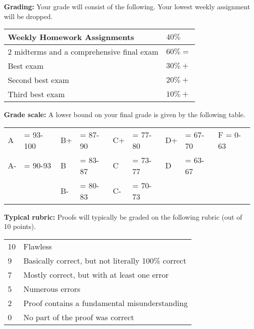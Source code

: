 \documentclass[12pt]{article}
\begin{document}
\noindent\textbf{Grading:}
Your grade will consist of the following. Your lowest weekly assignment will be dropped.

\begin{center}
 \begin{tabular}{|l|l|}
 \hline
 Weekly Homework Assignments & $40\%$ \\
 \hline
 2 midterms and a comprehensive final exam & $60\% = $ 	 \\
 Best exam & $30\% + $ 	 \\
 Second best exam& $20\% + $ 	 \\
 Third best exam & $10\% + $ 	 \\
 \hline
 \end{tabular}
\end{center}

\vspace*{.15in}
\noindent\textbf{Grade scale:}
A lower bound on your final grade is given by the following table.

\begin{center}
 \begin{tabular}{|ll|ll|ll|ll|l|}
\hline
A &\hspace{-3 pt}\hspace{-7 pt}= 93-100 &B+ &\hspace{-7 pt}= 87-90 &C+ &\hspace{-7 pt}= 77-80 & D+ &\hspace{-7 pt}= 67-70 & F = 0-63\\
A- &\hspace{-3 pt}\hspace{-7 pt}= 90-93 &B &\hspace{-7 pt}= 83-87 & C &\hspace{-7 pt}= 73-77 & D &\hspace{-7 pt}= 63-67 &\\
 & &B- &\hspace{-7 pt}= 80-83 &C- &\hspace{-7 pt}= 70-73 & & &\\
 \hline
 \end{tabular}
\end{center}

\newpage
\vspace*{.15in}
\noindent\textbf{Typical rubric:}
Proofs will typically be graded on the following rubric (out of 10 points).

\begin{center}
 \begin{tabular}{|l|l|}
 \hline
 10& Flawless\\
 9& Basically correct, but not literally 100\% correct\\
 7& Mostly correct, but with at least one error\\
 5& Numerous errors\\
 2& Proof contains a fundamental misunderstanding\\
 0& No part of the proof was correct\\
 \hline
 \end{tabular}
\end{center}
\end{document}
